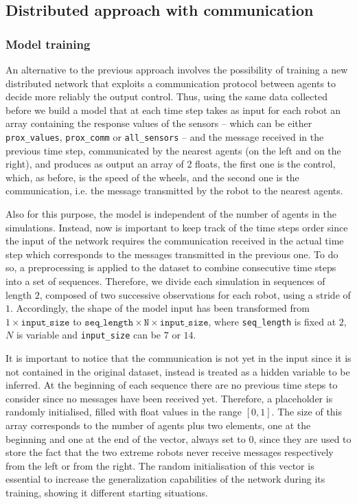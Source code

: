 \subsection{Distributed approach with communication}
\label{subsec:ex1comm}

\subsubsection{Model training}
\label{subsubsec:learnedcomm}
An alternative to the previous approach involves the possibility of training a 
new distributed network that exploits a communication protocol between 
agents to decide more reliably the output control. 
Thus, using the same data collected before we build a model that at each time 
step takes as input for each robot an array containing the response values of the 
sensors – which can be either \texttt{prox\_values}, \texttt{prox\_comm} or 
\texttt{all\_sensors} – and the message received in the previous time step, 
communicated by the nearest agents (on the left and on the right), and produces 
as output an array of 2 floats, the first one is the control, which, as before, is the 
speed of the wheels, and the second one is the communication, i.e. the message 
transmitted by the robot to the nearest agents.

Also for this purpose, the model is independent of the number of agents in 
the simulations. Instead, now is important to keep track of the time steps order 
since the input of the network requires the communication received in the 
actual time step which corresponds to the messages transmitted in the previous 
one. To do so, a preprocessing is applied to the dataset to combine consecutive 
time steps into a set of sequences. Therefore, we divide each simulation in 
sequences of length $2$, composed of two successive observations for each 
robot, using a stride of $1$.   
Accordingly, the shape of the model input has been transformed from $1 \times 
\mathtt{input\_size}$ to $\mathtt{seq\_length} \times \mathtt{N} \times 
\mathtt{input\_size}$, where \texttt{seq\_length} is fixed at $2$, $N$ is variable 
and \texttt{input\_size} can be $7$ or $14$.

It is important to notice that the communication is not yet in the input since 
it is not contained in the original dataset, instead is treated as a hidden 
variable to be inferred. 
At the beginning of each sequence there are no previous time steps to 
consider since no messages have been received yet. Therefore, a placeholder 
is randomly initialised, filled with float values in the range $[0, 1]$. 
The size of this array corresponds to the number of agents plus two 
elements, one at the beginning and one at the end of the vector, always set 
to $0$, since they are used to store the fact that the two extreme robots 
never receive messages respectively from the left or from the right. 
The random initialisation of this vector is essential to increase the 
generalization capabilities of the network during its training, showing it 
different starting situations.

